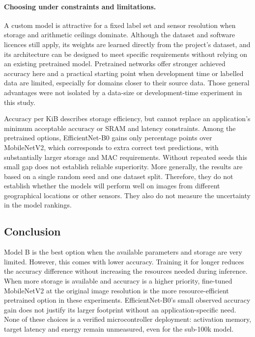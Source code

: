 \paragraph{Choosing under constraints and limitations.}
A custom model is attractive for a fixed label set and sensor resolution when
storage and arithmetic ceilings dominate. Although the dataset and software 
licences still apply, its weights are learned directly 
from the project's dataset, and its architecture can be designed to meet 
specific requirements without relying on an existing pretrained model.
Pretrained networks offer stronger achieved
accuracy here and a practical starting point when development time or
labelled data are limited, especially for domains closer to their source
data. Those general advantages were not isolated by a data-size or
development-time experiment in this study.

Accuracy per KiB describes storage efficiency, but cannot replace an
application's minimum acceptable accuracy or SRAM and latency constraints.
Among the pretrained options, EfficientNet-B0 gains only
\FinalSOTAGap{} percentage points over MobileNetV2, which corresponds to
\FinalSOTAExtraCorrect{} extra correct test predictions, with substantially
larger storage and MAC requirements. Without repeated seeds this small gap
does not establish reliable superiority. More generally, the results are 
based on a single random seed and one dataset split. Therefore, they do 
not establish whether the models will perform well on images from different 
geographical locations or other sensors. They also do not measure the 
uncertainty in the model rankings.

\subsection{Conclusion}
\label{sec:conclusion}

Model B is the best option when the available parameters and storage are 
very limited. However, this comes with lower accuracy. Training it for 
longer reduces the accuracy difference without increasing the 
resources needed during inference. When more storage is available 
and accuracy is a higher priority, fine-tuned MobileNetV2 at the original 
image resolution is the more resource-efficient pretrained option in these experiments.
EfficientNet-B0's small observed accuracy gain does not justify its larger
footprint without an application-specific need. None of these choices is a
verified microcontroller deployment: activation memory, target latency and
energy remain unmeasured, even for the sub-100k model.
